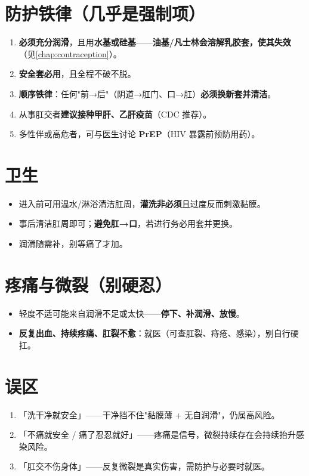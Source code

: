 \documentclass[12pt,UTF8,openany]{ctexbook}
\begin{document}
\section{防护铁律（几乎是强制项）}

\begin{enumerate}[leftmargin=2em,itemsep=0.3em]
  \item \textbf{必须充分润滑}，且用\textbf{水基或硅基}——\textbf{油基/凡士林会溶解乳胶套，使其失效}（见\ref{chap:contraception}）。
  \item \textbf{安全套必用}，且全程不破不脱。
  \item \textbf{顺序铁律}：任何"前→后"（阴道→肛门、口→肛）\textbf{必须换新套并清洁}。
  \item 从事肛交者\textbf{建议接种甲肝、乙肝疫苗}（CDC 推荐）。
  \item 多性伴或高危者，可与医生讨论 \textbf{PrEP}（HIV 暴露前预防用药）。
\end{enumerate}

\section{卫生}

\begin{itemize}[leftmargin=2em,itemsep=0.3em]
  \item 进入前可用温水/淋浴清洁肛周，\textbf{灌洗非必须}且过度反而刺激黏膜。
  \item 事后清洁肛周即可；\textbf{避免肛→口}，若进行务必用套并更换。
  \item 润滑随需补，别等痛了才加。
\end{itemize}

\section{疼痛与微裂（别硬忍）}

\begin{itemize}[leftmargin=2em,itemsep=0.3em]
  \item 轻度不适可能来自润滑不足或太快——\textbf{停下、补润滑、放慢}。
  \item \textbf{反复出血、持续疼痛、肛裂不愈}：就医（可查肛裂、痔疮、感染），别自行硬扛。
\end{itemize}

\section{误区}

\begin{enumerate}[leftmargin=2em,itemsep=0.3em]
  \item 「洗干净就安全」——干净挡不住"黏膜薄 + 无自润滑"，仍属高风险。
  \item 「不痛就安全 / 痛了忍忍就好」——疼痛是信号，微裂持续存在会持续抬升感染风险。
  \item 「肛交不伤身体」——反复微裂是真实伤害，需防护与必要时就医。
\end{enumerate}
\end{document}
